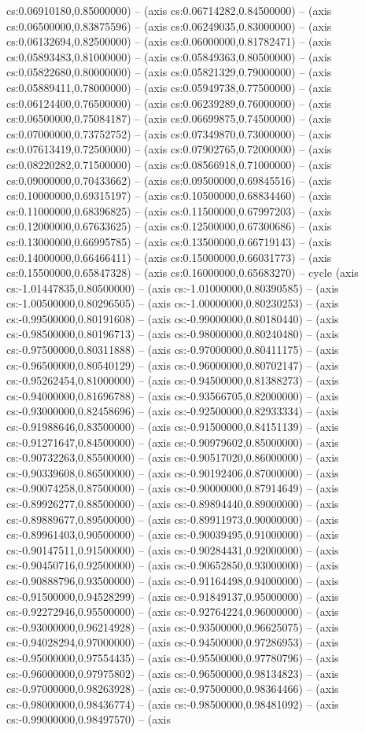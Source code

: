 cs:0.06910180,0.85000000) -- (axis cs:0.06714282,0.84500000) -- (axis cs:0.06500000,0.83875596) -- (axis cs:0.06249035,0.83000000) -- (axis cs:0.06132694,0.82500000) -- (axis cs:0.06000000,0.81782471) -- (axis cs:0.05893483,0.81000000) -- (axis cs:0.05849363,0.80500000) -- (axis cs:0.05822680,0.80000000) -- (axis cs:0.05821329,0.79000000) -- (axis cs:0.05889411,0.78000000) -- (axis cs:0.05949738,0.77500000) -- (axis cs:0.06124400,0.76500000) -- (axis cs:0.06239289,0.76000000) -- (axis cs:0.06500000,0.75084187) -- (axis cs:0.06699875,0.74500000) -- (axis cs:0.07000000,0.73752752) -- (axis cs:0.07349870,0.73000000) -- (axis cs:0.07613419,0.72500000) -- (axis cs:0.07902765,0.72000000) -- (axis cs:0.08220282,0.71500000) -- (axis cs:0.08566918,0.71000000) -- (axis cs:0.09000000,0.70433662) -- (axis cs:0.09500000,0.69845516) -- (axis cs:0.10000000,0.69315197) -- (axis cs:0.10500000,0.68834460) -- (axis cs:0.11000000,0.68396825) -- (axis cs:0.11500000,0.67997203) -- (axis cs:0.12000000,0.67633625) -- (axis cs:0.12500000,0.67300686) -- (axis cs:0.13000000,0.66995785) -- (axis cs:0.13500000,0.66719143) -- (axis cs:0.14000000,0.66466411) -- (axis cs:0.15000000,0.66031773) -- (axis cs:0.15500000,0.65847328) -- (axis cs:0.16000000,0.65683270) -- cycle (axis cs:-1.01447835,0.80500000) -- (axis cs:-1.01000000,0.80390585) -- (axis cs:-1.00500000,0.80296505) -- (axis cs:-1.00000000,0.80230253) -- (axis cs:-0.99500000,0.80191608) -- (axis cs:-0.99000000,0.80180440) -- (axis cs:-0.98500000,0.80196713) -- (axis cs:-0.98000000,0.80240480) -- (axis cs:-0.97500000,0.80311888) -- (axis cs:-0.97000000,0.80411175) -- (axis cs:-0.96500000,0.80540129) -- (axis cs:-0.96000000,0.80702147) -- (axis cs:-0.95262454,0.81000000) -- (axis cs:-0.94500000,0.81388273) -- (axis cs:-0.94000000,0.81696788) -- (axis cs:-0.93566705,0.82000000) -- (axis cs:-0.93000000,0.82458696) -- (axis cs:-0.92500000,0.82933334) -- (axis cs:-0.91988646,0.83500000) -- (axis cs:-0.91500000,0.84151139) -- (axis cs:-0.91271647,0.84500000) -- (axis cs:-0.90979602,0.85000000) -- (axis cs:-0.90732263,0.85500000) -- (axis cs:-0.90517020,0.86000000) -- (axis cs:-0.90339608,0.86500000) -- (axis cs:-0.90192406,0.87000000) -- (axis cs:-0.90074258,0.87500000) -- (axis cs:-0.90000000,0.87914649) -- (axis cs:-0.89926277,0.88500000) -- (axis cs:-0.89894440,0.89000000) -- (axis cs:-0.89889677,0.89500000) -- (axis cs:-0.89911973,0.90000000) -- (axis cs:-0.89961403,0.90500000) -- (axis cs:-0.90039495,0.91000000) -- (axis cs:-0.90147511,0.91500000) -- (axis cs:-0.90284431,0.92000000) -- (axis cs:-0.90450716,0.92500000) -- (axis cs:-0.90652850,0.93000000) -- (axis cs:-0.90888796,0.93500000) -- (axis cs:-0.91164498,0.94000000) -- (axis cs:-0.91500000,0.94528299) -- (axis cs:-0.91849137,0.95000000) -- (axis cs:-0.92272946,0.95500000) -- (axis cs:-0.92764224,0.96000000) -- (axis cs:-0.93000000,0.96214928) -- (axis cs:-0.93500000,0.96625075) -- (axis cs:-0.94028294,0.97000000) -- (axis cs:-0.94500000,0.97286953) -- (axis cs:-0.95000000,0.97554435) -- (axis cs:-0.95500000,0.97780796) -- (axis cs:-0.96000000,0.97975802) -- (axis cs:-0.96500000,0.98134823) -- (axis cs:-0.97000000,0.98263928) -- (axis cs:-0.97500000,0.98364466) -- (axis cs:-0.98000000,0.98436774) -- (axis cs:-0.98500000,0.98481092) -- (axis cs:-0.99000000,0.98497570) -- (axis 